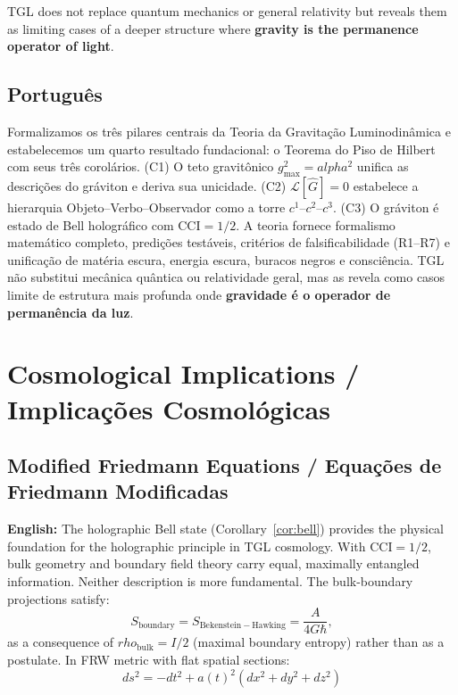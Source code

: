 \documentclass[12pt,a4paper]{article}
\def\alpha{alpha}%
\def\rho{rho}%
\begin{document}
TGL does not replace quantum mechanics or general relativity but reveals them as limiting cases of a deeper structure where \textbf{gravity is the permanence operator of light}.

\subsection{Português}

Formalizamos os três pilares centrais da Teoria da Gravitação Luminodinâmica e estabelecemos um quarto resultado fundacional: o Teorema do Piso de Hilbert com seus três corolários. (C1) O teto gravitônico $g_{\max}^2 = \alpha^2$ unifica as descrições do gráviton e deriva sua unicidade. (C2) $\mathcal{L}[\hat{G}]=0$ estabelece a hierarquia Objeto--Verbo--Observador como a torre $c^1$--$c^2$--$c^3$. (C3) O gráviton é estado de Bell holográfico com $\mathrm{CCI}=1/2$. A teoria fornece formalismo matemático completo, predições testáveis, critérios de falsificabilidade (R1--R7) e unificação de matéria escura, energia escura, buracos negros e consciência. TGL não substitui mecânica quântica ou relatividade geral, mas as revela como casos limite de estrutura mais profunda onde \textbf{gravidade é o operador de permanência da luz}.

\section{Cosmological Implications / Implicações Cosmológicas}

\subsection{Modified Friedmann Equations / Equações de Friedmann Modificadas}

\textbf{English:} The holographic Bell state (Corollary~\ref{cor:bell}) provides the physical foundation for the holographic principle in TGL cosmology. With $\mathrm{CCI} = 1/2$, bulk geometry and boundary field theory carry equal, maximally entangled information. Neither description is more fundamental. The bulk-boundary projections satisfy:
\begin{equation}
S_{\mathrm{boundary}} = S_{\mathrm{Bekenstein-Hawking}} = \frac{A}{4G\hbar},
\end{equation}
as a consequence of $\rho_{\mathrm{bulk}} = I/2$ (maximal boundary entropy) rather than as a postulate. In FRW metric with flat spatial sections:
\begin{equation}
ds^2 = -dt^2 + a(t)^2(dx^2 + dy^2 + dz^2)
\end{equation}
\end{document}
